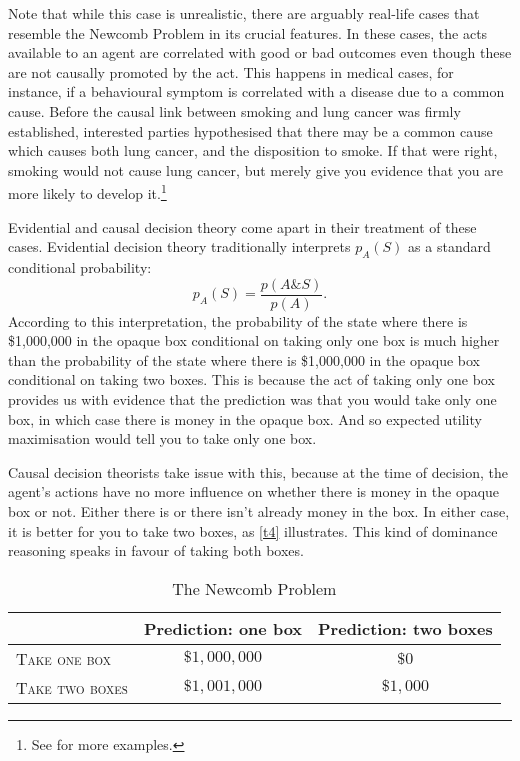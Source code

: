 Note that while this case is unrealistic, there are arguably real-life cases that resemble the Newcomb Problem in its crucial features. In these cases, the acts available to an agent are correlated with good or bad outcomes even though these are not causally promoted by the act. This happens in medical cases, for instance, if a behavioural symptom is correlated with a disease due to a common cause. Before the causal link between smoking and lung cancer was firmly established, interested parties hypothesised that there may be a common cause which causes both lung cancer, and the disposition to smoke. If that were right, smoking would not cause lung cancer, but merely give you evidence that you are more likely to develop it.\footnote{See \citet{Price1991} for more examples.}

Evidential and causal decision theory come apart in their treatment of these cases. Evidential decision theory traditionally interprets $p_{A} (S)$ as a standard conditional probability:
$$p_{A} (S) = \frac{p(A\&S)}{p(A)}.$$
According to this interpretation, the probability of the state where there is \$1,000,000 in the opaque box conditional on taking only one box is much higher than the probability of the state where there is \$1,000,000 in the opaque box conditional on taking two boxes. This is because the act of taking only one box provides us with evidence that the prediction was that you would take only one box, in which case there is money in the opaque box. And so expected utility maximisation would tell you to take only one box.

Causal decision theorists take issue with this, because at the time of decision, the agent's actions have no more influence on whether there is money in the opaque box or not. Either there is or there isn't already money in the box. In either case, it is better for you to take two boxes, as \autoref{t4} illustrates. This kind of dominance reasoning speaks in favour of taking both boxes.

\begin{table}[h]
\centering
  \begin{tabular}{lcc}
  \hline
                           & Prediction: one box & Prediction: two boxes\\\hline\hline
  \textsc{Take one box}    & $\$1,000,000$ & $\$0$ \\
  \textsc{Take two boxes}  & $\$1,001,000$ & $\$1,000$\\
  \hline
  \end{tabular}
\caption{The Newcomb Problem}
\label{t4}
\end{table}


